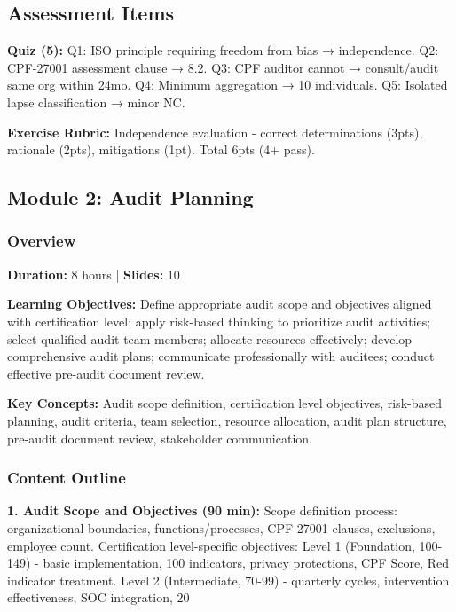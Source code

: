 \documentclass[11pt,a4paper]{article}
\begin{document}
\subsection{Assessment Items}
\textbf{Quiz (5):} Q1: ISO principle requiring freedom from bias → independence. Q2: CPF-27001 assessment clause → 8.2. Q3: CPF auditor cannot → consult/audit same org within 24mo. Q4: Minimum aggregation → 10 individuals. Q5: Isolated lapse classification → minor NC.

\textbf{Exercise Rubric:} Independence evaluation - correct determinations (3pts), rationale (2pts), mitigations (1pt). Total 6pts (4+ pass).

\subsection{Module 2: Audit Planning}

\subsubsection{Overview}
\textbf{Duration:} 8 hours | \textbf{Slides:} 10

\textbf{Learning Objectives:} Define appropriate audit scope and objectives aligned with certification level; apply risk-based thinking to prioritize audit activities; select qualified audit team members; allocate resources effectively; develop comprehensive audit plans; communicate professionally with auditees; conduct effective pre-audit document review.

\textbf{Key Concepts:} Audit scope definition, certification level objectives, risk-based planning, audit criteria, team selection, resource allocation, audit plan structure, pre-audit document review, stakeholder communication.

\subsubsection{Content Outline}

\textbf{1. Audit Scope and Objectives (90 min):} Scope definition process: organizational boundaries, functions/processes, CPF-27001 clauses, exclusions, employee count. Certification level-specific objectives: Level 1 (Foundation, 100-149) - basic implementation, 100 indicators, privacy protections, CPF Score, Red indicator treatment. Level 2 (Intermediate, 70-99) - quarterly cycles, intervention effectiveness, SOC integration, 20%
\end{document}
